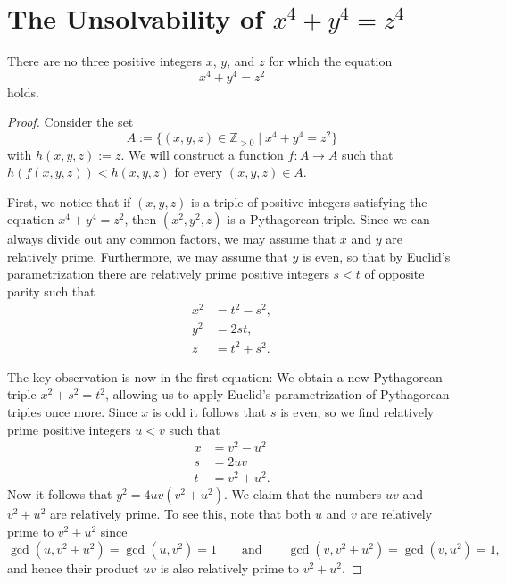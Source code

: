\section{The Unsolvability of \texorpdfstring{$x^4+y^4=z^4$}{x⁴ + y⁴ = z⁴}}

\begin{theorem}
  There are no three positive integers $x$, $y$, and $z$ for which the equation
  \begin{equation*}
    x^4+y^4=z^2
  \end{equation*}
  holds.
\end{theorem}

\begin{proof}
  Consider the set
  \begin{equation*}
    A:=\{(x,y,z)\in\mathbb{Z}_{>0} \mid x^4+y^4=z^2\}
  \end{equation*}
  with $h(x,y,z):=z$. We will construct a function $f:A\to A$ such that $h(f(x,y,z))<h(x,y,z)$ for every $(x,y,z)\in A$.
  
  First, we notice that if $(x,y,z)$ is a triple of positive integers satisfying the equation $x^4+y^4=z^2$, then $(x^2,y^2,z)$ is a Pythagorean triple. Since we can always divide out any common factors, we may assume that $x$ and $y$ are relatively prime. Furthermore, we may assume that $y$ is even, so that by Euclid's parametrization there are relatively prime positive integers $s<t$ of opposite parity such that
  \begin{align*}
    x^2 & = t^2-s^2, \\
    y^2 & = 2st, \\
      z & = t^2+s^2.
  \end{align*}

  The key observation is now in the first equation: We obtain a new Pythagorean triple $x^2+s^2=t^2$, allowing us to apply Euclid's parametrization of Pythagorean triples once more. Since $x$ is odd it follows that $s$ is even, so we find relatively prime positive integers $u<v$ such that
  \begin{align*}
    x & = v^2-u^2 \\
    s & = 2uv \\
    t & = v^2+u^2.
  \end{align*}
  Now it follows that $y^2 = 4uv (v^2+u^2)$. We claim that the numbers $uv$ and $v^2+u^2$ are relatively prime. To see this, note that both $u$ and $v$ are relatively prime to $v^2+u^2$ since
  \begin{equation*}
    \gcd(u,v^2+u^2)=\gcd(u,v^2)=1\qquad\text{and}\qquad\gcd(v,v^2+u^2)=\gcd(v,u^2)=1,
  \end{equation*}
  and hence their product $uv$ is also relatively prime to $v^2+u^2$.


\end{proof}
